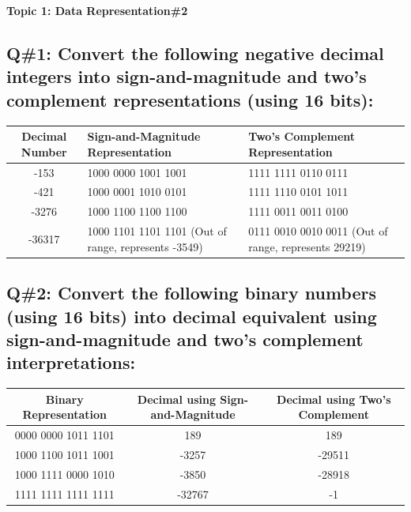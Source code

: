 \textbf{Topic 1: Data Representation\#2}\\
\subsection{Q\#1: Convert the following negative decimal integers into sign-and-magnitude and two’s complement representations (using 16 bits):}

\begin{tabularx}{\textwidth}{|c|X|X|}
\hline
\textbf{Decimal Number} & \textbf{Sign-and-Magnitude Representation} & \textbf{Two’s Complement Representation} \\
\hline -153 & 1000 0000 1001 1001 & 1111 1111 0110 0111 \\
\hline -421 & 1000 0001 1010 0101 & 1111 1110 0101 1011 \\
\hline -3276 & 1000 1100 1100 1100 & 1111 0011 0011 0100 \\
\hline -36317 & 
1000 1101 1101 1101 (Out of range, represents -3549) & 
0111 0010 0010 0011 (Out of range, represents 29219)\\
\hline
\end{tabularx}

\subsection{Q\#2: Convert the following binary numbers (using 16 bits) into decimal equivalent using sign-and-magnitude and two’s complement interpretations:}
\begin{tabularx}{\textwidth}{|c|c|c|}
\hline
\textbf{Binary Representation} & \textbf{Decimal using Sign-and-Magnitude} & \textbf{Decimal using Two’s Complement} \\
\hline
0000 0000 1011 1101 & 189 & 189 \\
\hline
1000 1100 1011 1001 & -3257 & -29511 \\
\hline
1000 1111 0000 1010 & -3850 & -28918 \\
\hline
1111 1111 1111 1111 & -32767 & -1 \\
\hline
\end{tabularx}
